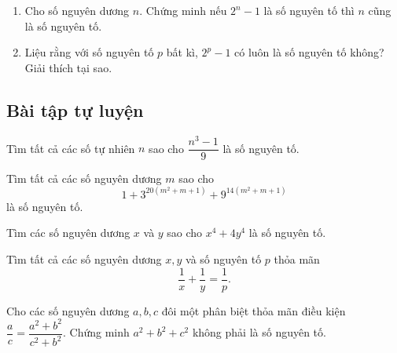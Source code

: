 \begin{bx}\hfill
\begin{enumerate}[a,]
    \item Cho số nguyên dương $n.$ Chứng minh nếu $2^{n}-1$ là số nguyên tố thì $n$ cũng là số nguyên tố.
    \item Liệu rằng với số nguyên tố $p$ bất kì, $2^p-1$ có luôn là số nguyên tố không? Giải thích tại sao.
\end{enumerate}
\end{bx}
\subsection{Bài tập tự luyện}
\begin{btt}
Tìm tất cả các số tự nhiên $n$ sao cho $\dfrac{n^3 - 1}{9}$ là số nguyên tố.
\end{btt}
\begin{btt}
Tìm tất cả các số nguyên dương $m$ sao cho $$1+3^{20\left(m^2+m+1\right)}+9^{14\left(m^2+m+1\right)}$$ là số nguyên tố.
\end{btt}

\begin{btt}
Tìm các số nguyên dương $x$ và $y$ sao cho $x^4+4y^4$ là số nguyên tố.
\end{btt}

\begin{btt}
Tìm tất cả các số nguyên dương $x,y$ và số nguyên tố $p$ thỏa mãn \[\dfrac{1}{x}+\dfrac{1}{y}=\dfrac{1}{p}.\]
\end{btt}

\begin{btt}
Cho các số nguyên dương $a,b,c$ đôi một phân biệt thỏa mãn điều kiện $\dfrac{a}{c}=\dfrac{a^2+b^2}{c^2+b^2}$. Chứng minh $a^2+b^2+c^2$ không phải là số nguyên tố.
\end{btt} 

